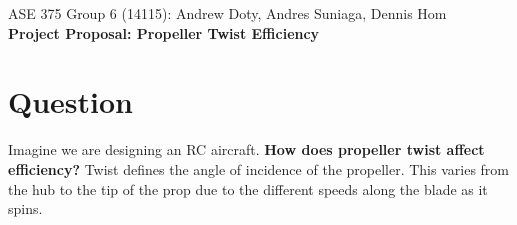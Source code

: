 \documentclass{article}
\begin{document}
\begin{flushleft}
    \small{ASE 375 Group 6 (14115): Andrew Doty, Andres Suniaga, Dennis Hom}\\[2mm]    
    \Large{\textbf{Project Proposal: Propeller Twist Efficiency}}\\[2mm]
\end{flushleft}
 
 
 
 
 
 
 
 

\section{Question}
Imagine we are designing an RC aircraft. \textbf{How does propeller twist affect efficiency?} Twist defines the angle of incidence of the propeller. This varies from the hub to the tip of the prop due to the different speeds along the blade as it spins.
\end{document}

